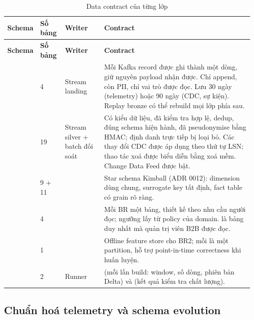 {\small
\begin{longtable}{@{}L{2.1cm}L{1.2cm}L{3.0cm}L{8.2cm}@{}}
\caption{Data contract của từng lớp}\label{tab:layers-contract}\\
\toprule
\textbf{Schema} & \textbf{Số bảng} & \textbf{Writer} & \textbf{Contract} \\
\midrule
\endfirsthead
\toprule
\textbf{Schema} & \textbf{Số bảng} & \textbf{Writer} & \textbf{Contract} \\
\midrule
\endhead
{} & 4 & Stream landing & Mỗi Kafka record được ghi thành một dòng, giữ nguyên payload nhận được. Chỉ append, còn PII, chỉ vai trò  được đọc. Lưu 30 ngày (telemetry) hoặc 90 ngày (CDC, sự kiện). Replay bronze có thể rebuild mọi lớp phía sau. \\
 & 19 & Stream silver + batch đối soát & Có kiểu dữ liệu, đã kiểm tra hợp lệ, dedup, đúng schema hiện hành, đã pseudonymise bằng HMAC; định danh trực tiếp bị loại bỏ. Các thay đổi CDC được áp dụng theo thứ tự LSN; thao tác xoá được biểu diễn bằng xoá mềm. Change Data Feed được bật. \\
 & 9 + 11 &  & Star schema Kimball (ADR 0012): dimension dùng chung, surrogate key tất định, fact table có grain rõ ràng. \\
 & 4 &  & Mỗi BR một bảng, thiết kế theo nhu cầu người đọc; ngưỡng lấy từ policy của domain.  là bảng duy nhất mà quản trị viên B2B được đọc. \\
 & 1 &   & Offline feature store cho BR2; mỗi  là một partition, hỗ trợ point-in-time correctness khi huấn luyện. \\
 & 2 & Runner &  (mỗi lần build: window, số dòng, phiên bản Delta) và  (kết quả kiểm tra chất lượng). \\
\bottomrule
\end{longtable}}

\subsection{Chuẩn hoá telemetry và schema evolution}


